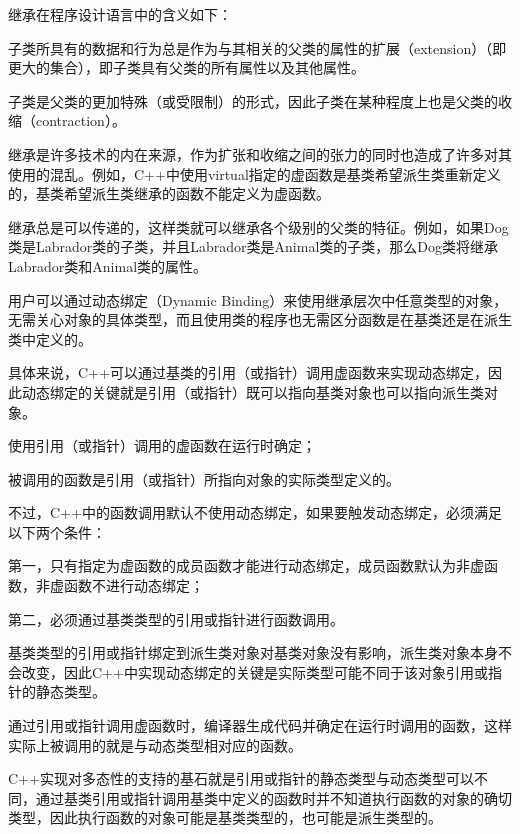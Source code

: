 继承在程序设计语言中的含义如下：

\begin{compactitem}
\item 子类所具有的数据和行为总是作为与其相关的父类的属性的扩展（extension）（即更大的集合），即子类具有父类的所有属性以及其他属性。
\item 子类是父类的更加特殊（或受限制）的形式，因此子类在某种程度上也是父类的收缩（contraction）。
\end{compactitem}

继承是许多技术的内在来源，作为扩张和收缩之间的张力的同时也造成了许多对其使用的混乱。例如，C++中使用virtual指定的虚函数是基类希望派生类重新定义的，基类希望派生类继承的函数不能定义为虚函数。


继承总是可以传递的，这样类就可以继承各个级别的父类的特征。例如，如果Dog类是Labrador类的子类，并且Labrador类是Animal类的子类，那么Dog类将继承Labrador类和Animal类的属性。


用户可以通过动态绑定（Dynamic Binding）来使用继承层次中任意类型的对象，无需关心对象的具体类型，而且使用类的程序也无需区分函数是在基类还是在派生类中定义的。

具体来说，C++可以通过基类的引用（或指针）调用虚函数来实现动态绑定，因此动态绑定的关键就是引用（或指针）既可以指向基类对象也可以指向派生类对象。

\begin{compactitem}
\item 使用引用（或指针）调用的虚函数在运行时确定；
\item 被调用的函数是引用（或指针）所指向对象的实际类型定义的。
\end{compactitem}

不过，C++中的函数调用默认不使用动态绑定，如果要触发动态绑定，必须满足以下两个条件：

\begin{compactitem}
\item 第一，只有指定为虚函数的成员函数才能进行动态绑定，成员函数默认为非虚函数，非虚函数不进行动态绑定；
\item 第二，必须通过基类类型的引用或指针进行函数调用。
\end{compactitem}

基类类型的引用或指针绑定到派生类对象对基类对象没有影响，派生类对象本身不会改变，因此C++中实现动态绑定的关键是实际类型可能不同于该对象引用或指针的静态类型。

通过引用或指针调用虚函数时，编译器生成代码并确定在运行时调用的函数，这样实际上被调用的就是与动态类型相对应的函数。

C++实现对多态性的支持的基石就是引用或指针的静态类型与动态类型可以不同，通过基类引用或指针调用基类中定义的函数时并不知道执行函数的对象的确切类型，因此执行函数的对象可能是基类类型的，也可能是派生类型的。

